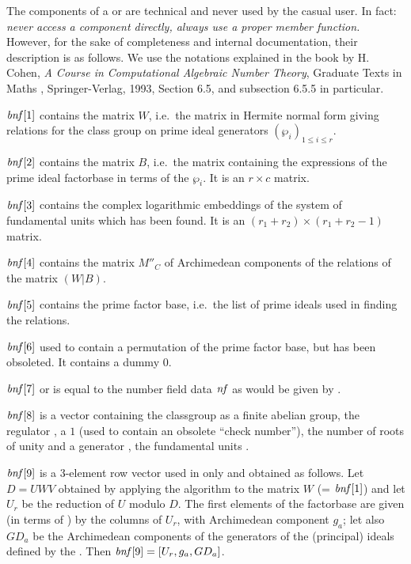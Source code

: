 The components of a  or  are technical and never used by
the casual user. In fact: \emph{never access a component directly, always use
a proper member function.} However, for the sake of completeness and internal
documentation, their description is as follows. We use the notations
explained in the book by H. Cohen, \emph{A Course in Computational Algebraic
Number Theory}, Graduate Texts in Maths , Springer-Verlag, 1993,
Section 6.5, and subsection 6.5.5 in particular.

$\hbox{\it bnf\/}[1]$ contains the matrix $W$, i.e.~the matrix in Hermite normal
form giving relations for the class group on prime ideal generators
$(\wp_i)_{1\le i\le r}$.

$\hbox{\it bnf\/}[2]$ contains the matrix $B$, i.e.~the matrix containing the
expressions of the prime ideal factorbase in terms of the $\wp_i$. It is an
$r\times c$ matrix.

$\hbox{\it bnf\/}[3]$ contains the complex logarithmic embeddings of the system of
fundamental units which has been found. It is an $(r_1+r_2)\times(r_1+r_2-1)$
matrix.

$\hbox{\it bnf\/}[4]$ contains the matrix $M''_C$ of Archimedean components of the
relations of the matrix $(W|B)$.

$\hbox{\it bnf\/}[5]$ contains the prime factor base, i.e.~the list of prime
ideals used in finding the relations.

$\hbox{\it bnf\/}[6]$ used to contain a permutation of the prime factor base, but
has been obsoleted. It contains a dummy $0$.

$\hbox{\it bnf\/}[7]$ or  is equal to the number field data
$\hbox{\it nf\/}$ as would be given by .

$\hbox{\it bnf\/}[8]$ is a vector containing the classgroup 
as a finite abelian group, the regulator , a $1$ (used to
contain an obsolete ``check number''), the number of roots of unity and a
generator , the fundamental units .

$\hbox{\it bnf\/}[9]$ is a 3-element row vector used in  only
and obtained as follows. Let $D = U W V$ obtained by applying the
 algorithm to the matrix $W$ (= $\hbox{\it bnf\/}[1]$) and
let $U_r$ be the reduction of $U$ modulo $D$. The first elements of the
factorbase are given (in terms of ) by the columns of $U_r$,
with Archimedean component $g_a$; let also $GD_a$ be the Archimedean
components of the generators of the (principal) ideals defined by the
. Then $\hbox{\it bnf\/}[9]=[U_r, g_a, GD_a]$.

